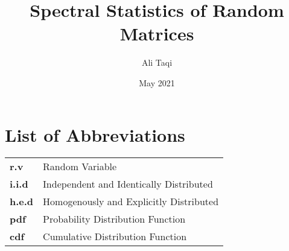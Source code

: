 \documentclass[12pt,twoside]{reedthesis}
\title{Spectral Statistics of Random Matrices}
\author{Ali Taqi}
\date{May 2021}
\begin{document}
  \maketitle
  \frontmatter %
  \pagestyle{empty} %



    \chapter*{List of Abbreviations}

	\begin{table}[h]
	\centering %
	\begin{tabular}{ll}
		\textbf{r.v}  	  &  Random Variable \\
		\textbf{i.i.d}  	&  Independent and Identically Distributed \\
		\textbf{h.e.d}    &  Homogenously and Explicitly Distributed \\
		\textbf{pdf}      &  Probability Distribution Function \\
		\textbf{cdf}      &  Cumulative Distribution Function \\
		\end{tabular}
	\end{table}

    \tableofcontents

    \listoftables \hfill

    \begin{center}

    \Ddisttable \newline

    \hfill \vspace{2em}

    \spectrumschemetable \newline

    \hfill \vspace{2em}

    \dispersiontable \newline

    \hfill \vspace{2em}

    \pairingschemetable \newline

    \end{center}
\end{document}
